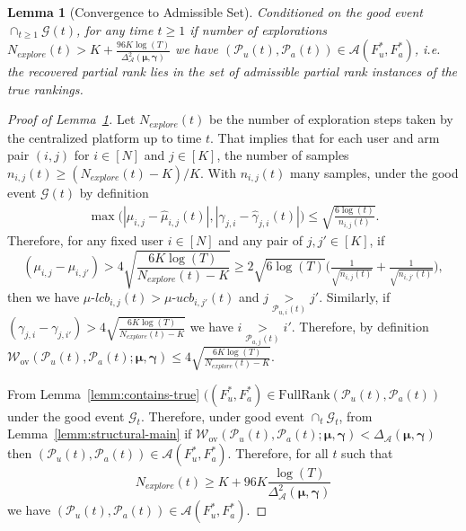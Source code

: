 \documentclass{article}
\newtheorem{lemma}[theorem]{Lemma}
\newcommand\uucb{\mu\text{-}ucb}
\newcommand\ulcb{\mu\text{-}lcb}
\begin{document}
\begin{lemma}[Convergence to Admissible Set]\label{lemm:admissible}
Conditioned on the good event $\cap_{t \geq 1}\mathcal{G}(t)$, for any time $t\geq 1$ if number of explorations $N_{explore}(t) > K + \frac{96K\log(T)}{\Delta^2_{\mathcal{A}}(\boldsymbol{\mu}, \boldsymbol{\gamma})}$ we have $(\mathcal{P}_{u}(t), \mathcal{P}_{a}(t)) \in \mathcal{A}(F^*_{u}, F^*_{a})$, i.e. the recovered partial rank lies in the set of admissible partial rank instances of the true rankings.
\end{lemma}
\begin{proof}[Proof of Lemma~\ref{lemm:admissible}]
   Let $N_{explore}(t)$ be the number of exploration steps taken by the centralized platform up to time $t$. That implies that for each user and arm pair $(i, j)$ for $i \in [N]$ and $j\in [K]$, the number of samples $n_{i,j}(t) \geq (N_{explore}(t) - K) / K$.  With $n_{i,j}(t)$ many samples, under the good event $\mathcal{G}(t)$ by definition
   \begin{align*}
       \max\Big(|\mu_{i,j} - \hat{\mu}_{i,j}(t)|, |\gamma_{j,i} - \hat{\gamma}_{j,i}(t)| \Big) \leq \sqrt{\frac{6\log(t)}{n_{i,j}(t)}}.
   \end{align*}
    Therefore, for any fixed user $i \in [N]$ and any pair of $j, j' \in [K]$, if 
    $$
    (\mu_{i,j} - \mu_{i,j'}) > 4\sqrt{\frac{6K\log(T)}{N_{explore}(t) - K}} \geq  2\sqrt{6\log(T)}\big(\tfrac{1}{\sqrt{n_{i,j}(t)}} + \tfrac{1}{\sqrt{n_{i,j'}(t)}}\big),
    $$ then we have $\ulcb_{i,j}(t) > \uucb_{i,j'}(t)$ and $j \underset{\mathcal{P}_{u, i}(t)}{>} j'$. Similarly, if $(\gamma_{j,i} - \gamma_{j, i'}) > 4\sqrt{\tfrac{6K\log(T)}{N_{explore}(t) - K}}$ we have $i \underset{\mathcal{P}_{a, j}(t)}{>} i'$. Therefore, by definition $\mathcal{W}_{\mathrm{ov}}(\mathcal{P}_u(t), \mathcal{P}_a(t); \boldsymbol{\mu}, \boldsymbol{\gamma}) \leq  4\sqrt{\tfrac{6K\log(T)}{N_{explore}(t) - K}}$.
    
    From Lemma~\ref{lemm:contains-true} $((F^*_{u}, F^*_{a}) \in \mathrm{FullRank}(\mathcal{P}_{u}(t), \mathcal{P}_{a}(t))$ under the good event $\mathcal{G}_t$. Therefore, under good event $\cap_t \mathcal{G}_t$, from Lemma~\ref{lemm:structural-main} if 
    $\mathcal{W}_{\mathrm{ov}}(\mathcal{P}_u(t), \mathcal{P}_a(t); \boldsymbol{\mu}, \boldsymbol{\gamma}) < \Delta_{\mathcal{A}}(\boldsymbol{\mu}, \boldsymbol{\gamma})$ then $(\mathcal{P}_{u}(t), \mathcal{P}_{a}(t)) \in \mathcal{A}(F^*_{u}, F^*_{a})$. Therefore, for all $t$ such that  
    $$
    N_{explore}(t) \geq K + 96 K \frac{\log(T)}{\Delta^2_{\mathcal{A}}(\boldsymbol{\mu}, \boldsymbol{\gamma})} 
    $$  
    we have $(\mathcal{P}_{u}(t), \mathcal{P}_{a}(t)) \in \mathcal{A}(F^*_{u}, F^*_{a})$.
\end{proof}
\end{document}
